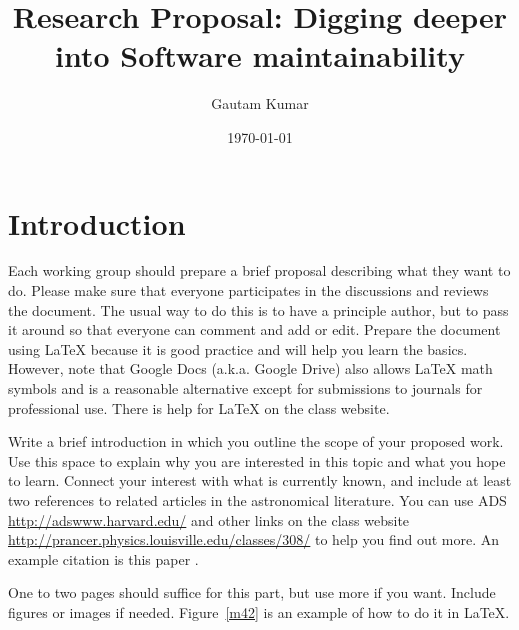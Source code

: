 \documentclass[dvips,12pt]{article}
\begin{document}

\title{Research Proposal: Digging deeper into Software maintainability}
\author{Gautam Kumar}
\date{\today}



\maketitle


\section{Introduction}


Each working group should prepare a brief proposal describing what they want 
to do.  Please make sure that everyone participates in the discussions and
reviews the document.  The usual way to do this is to have a principle author,
but to pass it around so that everyone can comment and add or edit.  Prepare the
document using \LaTeX\/ because it is good practice and will help you learn the
basics.  However, note that Google Docs (a.k.a. Google Drive) also allows
\LaTeX\/ math symbols and is a reasonable alternative except for submissions
to journals for professional use.  There is help for \LaTeX\/ on the
class website.

Write a brief introduction in which you  outline the scope of your proposed
work. Use this space to explain why you are interested in this topic and what
you hope to learn. Connect your interest with what is currently known, and
include at least two references to related articles in the astronomical
literature.  You can use ADS  \url{http://adswww.harvard.edu/} and other links
on the class website \url{http://prancer.physics.louisville.edu/classes/308/} 
to help you find out more. An example citation is this paper
\cite{gonzalez2012}.

One to two pages should suffice for this part, but use more if you want.  
Include figures or images if needed.  Figure~\ref{m42} is an example of  how to
do it in \LaTeX.
\end{document}
